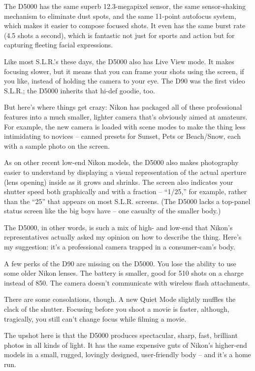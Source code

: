 \documentclass[12pt,a4paper,onecolumn]{article}
\begin{document}
The D5000 has the same superb 12.3-megapixel sensor, the same sensor-shaking mechanism to eliminate
dust spots, and the same 11-point autofocus system, which makes it easier to compose focused shots.
It even has the same burst rate (4.5 shots a second), which is fantastic not just for sports and
action but for capturing fleeting facial expressions.

Like most S.L.R.'s these days, the D5000 also has Live View mode. It makes focusing slower, but it
means that you can frame your shots using the screen, if you like, instead of holding the camera to
your eye. The D90 was the first video S.L.R.; the D5000 inherits that hi-def goodie, too.

But here's where things get crazy: Nikon has packaged all of these professional features into a much
smaller, lighter camera that's obviously aimed at amateurs. For example, the new camera is loaded
with scene modes to make the thing less intimidating to novices -- canned presets for Sunset, Pets
or Beach/Snow, each with a sample photo on the screen.

As on other recent low-end Nikon models, the D5000 also makes photography easier to understand by
displaying a visual representation of the actual aperture (lens opening) inside as it grows and
shrinks. The screen also indicates your shutter speed both graphically and with a fraction --
``1/25,'' for example, rather than the ``25'' that appears on most S.L.R. screens. (The D5000 lacks
a top-panel status screen like the big boys have -- one casualty of the smaller body.)

The D5000, in other words, is such a mix of high- and low-end that Nikon's representatives actually
asked my opinion on how to describe the thing. Here's my suggestion: it's a professional camera
trapped in a consumer-cam's body.

A few perks of the D90 are missing on the D5000. You lose the ability to use some older Nikon
lenses. The battery is smaller, good for 510 shots on a charge instead of 850. The camera doesn't
communicate with wireless flash attachments.

There are some consolations, though. A new Quiet Mode slightly muffles the clack of the shutter.
Focusing before you shoot a movie is faster, although, tragically, you still can't change focus
while filming a movie.

The upshot here is that the D5000 produces spectacular, sharp, fast, brilliant photos in all kinds
of light. It has the same expensive guts of Nikon's higher-end models in a small, rugged, lovingly
designed, user-friendly body -- and it's a home run.
\end{document}
